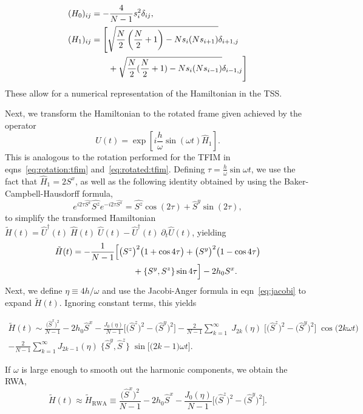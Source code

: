 \documentclass[%
reprint,
superscriptaddress,
amsmath,amssymb,
aps,
prb,
showkeys,
]{revtex4-2}
\begin{document}
	\begin{align}
		(H_0)_{ij} &= -\frac{4}{N-1} s^2_i \delta_{ij},\nonumber\\
		(H_1)_{ij} &= \Bigg[\sqrt{\frac{N}{2}\left(\frac{N}{2}+1\right) - Ns_i(Ns_{i + 1})}\delta_{i+1, j} \nonumber\\ 
		&\hskip 0.7cm +\sqrt{\frac{N}{2}(\frac{N}{2}+1) - Ns_i(Ns_{i- 1})}\delta_{i-1,j}\Bigg]
		\label{eq:lmg:tssham}
	\end{align}
	These allow for a numerical representation of the Hamiltonian in the TSS.
	
	Next, we transform the Hamiltonian to the rotated frame given achieved by the operator
	\begin{equation}
	\hat{U}(t)=\exp [i \frac{h}{\omega} \sin (\omega t) \hat{H}_{1}].
	\end{equation}
	This is analogous to the rotation performed for the TFIM in eqns~\ref{eq:rotation:tfim} and~\ref{eq:rotated:tfim}. Defining $\tau = \displaystyle\frac{h}{\omega}\sin{\omega t}$, we use the fact that $\hat{H}_1 = 2 S^x$, as well as the following identity obtained by using the Baker-Campbell-Hausdorff formula,
	\begin{equation}
	e^{i 2\tau\hat{S^{x}}} \hat{S^{z}} e^{-i 2\tau \hat{S^{x}}}=\hat{S^{z}} \cos \left(2\tau\right)+\hat{S}^{y} \sin (2\tau),
	\end{equation}
	to simplify the transformed Hamiltonian $\tilde{H}(t) = \hat{U}^\dagger(t)\;\hat{H}(t)\;\hat{U}(t) - \hat{U}^\dagger(t)\;\partial_t\hat{U}(t)$, yielding
	\begin{align}
		\label{eq:lmg_rotated}
		\tilde{H}(t)& = -\frac{1}{N-1}\Big[\big(S^z\big)^2 \big(1+\cos{4\tau}\big)+ \big(S^y\big)^2 \big(1-\cos{4\tau}\big)\nonumber \\  
		&\hskip 2.5cm + \pb{S^y}{S^z}
		\sin{4\tau}\Big] - 2 h_0 S^x.
	\end{align}
	Next, we define $\eta\equiv 4h/\omega$ and use the Jacobi-Anger formula in eqn~\ref{eq:jacobi}
	to expand $\tilde{H}(t)$. Ignoring constant terms, this yields
		\begin{widetext}
		\begin{multline}
			\label{eq:lmg_jacobiexp}
			\tilde{H}(t)\sim \frac{\big(\hat{S}^x\big)^{2}}{N-1} - 2h_0 \hat{S}^x - \frac{J_0(\eta)}{N-1}\bigg[\big(\hat{S}^z\big)^{2} - \big(\hat{S}^y\big)^{2} \bigg] - \frac{2}{N-1}\sum^\infty_{k=1}\;J_{2k}(\eta)\;\Big[\big( \hat{S}^z\big)^2 - \big( \hat{S}^y\big)^2\Big]\;\cos{\big(2k\omega t\big)}\\
			- \frac{2}{N-1}\sum^\infty_{k=1}J_{2k-1}(\eta)\;\big\{ \hat{S}^y,  \hat{S}^z \big\}  \;\sin{\Big[\big(2k-1\big)\omega t\Big]}.
		\end{multline}
	\end{widetext}
	If $\omega$ is large enough to smooth out the harmonic components, we obtain the RWA,
	\begin{equation}
		\label{eq:lmg_rwa}
	\tilde{H}(t)\approx \tilde{H}_{\mathrm{RWA}}\equiv \frac{\big(\hat{S}^x\big)^{2}}{N-1} - 2h_0 \hat{S}^x - \frac{J_0(\eta)}{N-1}\bigg[\big(\hat{S}^z\big)^{2} - \big(\hat{S}^y\big)^{2} \bigg].
	\end{equation}
\end{document}
